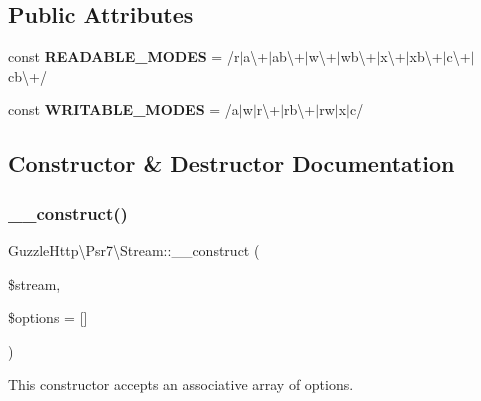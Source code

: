 \subsection*{Public Attributes}
\begin{DoxyCompactItemize}
\item 
\mbox{\label{classGuzzleHttp_1_1Psr7_1_1Stream_ad365fe808d0a605d9dc4d99761bdb0ca}} 
const {\bfseries R\+E\+A\+D\+A\+B\+L\+E\+\_\+\+M\+O\+D\+ES} = \textquotesingle{}/r$\vert$a\textbackslash{}+$\vert$ab\textbackslash{}+$\vert$w\textbackslash{}+$\vert$wb\textbackslash{}+$\vert$x\textbackslash{}+$\vert$xb\textbackslash{}+$\vert$c\textbackslash{}+$\vert$cb\textbackslash{}+/\textquotesingle{}
\item 
\mbox{\label{classGuzzleHttp_1_1Psr7_1_1Stream_a32b7e7b39b2748bdb344ea8ff3323534}} 
const {\bfseries W\+R\+I\+T\+A\+B\+L\+E\+\_\+\+M\+O\+D\+ES} = \textquotesingle{}/a$\vert$w$\vert$r\textbackslash{}+$\vert$rb\textbackslash{}+$\vert$rw$\vert$x$\vert$c/\textquotesingle{}
\end{DoxyCompactItemize}


\subsection{Constructor \& Destructor Documentation}
\mbox{\label{classGuzzleHttp_1_1Psr7_1_1Stream_ae3f42d9d8ff3d4debb51e33312bc6706}} 
\subsubsection{\texorpdfstring{\+\_\+\+\_\+construct()}{\_\_construct()}}
{\footnotesize\ttfamily Guzzle\+Http\textbackslash{}\+Psr7\textbackslash{}\+Stream\+::\+\_\+\+\_\+construct (\begin{DoxyParamCaption}\item[{}]{\$stream,  }\item[{}]{\$options = {\ttfamily \mbox{[}\mbox{]}} }\end{DoxyParamCaption})}

This constructor accepts an associative array of options.


